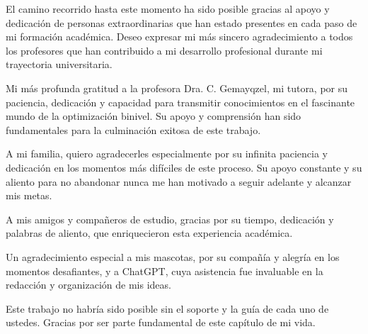 \begin{acknowledgements}
    El camino recorrido hasta este momento ha sido posible gracias al apoyo y dedicación de personas extraordinarias que han estado presentes en cada paso de mi formación académica. Deseo expresar mi más sincero agradecimiento a todos los profesores que han contribuido a mi desarrollo profesional durante mi trayectoria universitaria.

    Mi más profunda gratitud a la profesora Dra. C. Gemayqzel, mi tutora, por su paciencia, dedicación y capacidad para transmitir conocimientos en el fascinante mundo de la optimización binivel. Su apoyo y comprensión han sido fundamentales para la culminación exitosa de este trabajo.
    
    A mi familia, quiero agradecerles especialmente por su infinita paciencia y dedicación en los momentos más difíciles de este proceso. Su apoyo constante y su aliento para no abandonar nunca me han motivado a seguir adelante y alcanzar mis metas.
    
    A mis amigos y compañeros de estudio, gracias por su tiempo, dedicación y palabras de aliento, que enriquecieron esta experiencia académica. 
    
    Un agradecimiento especial a mis mascotas, por su compañía y alegría en los momentos desafiantes, y a ChatGPT, cuya asistencia fue invaluable en la redacción y organización de mis ideas.
    
    Este trabajo no habría sido posible sin el soporte y la guía de cada uno de ustedes. Gracias por ser parte fundamental de este capítulo de mi vida.
    
    
\end{acknowledgements}